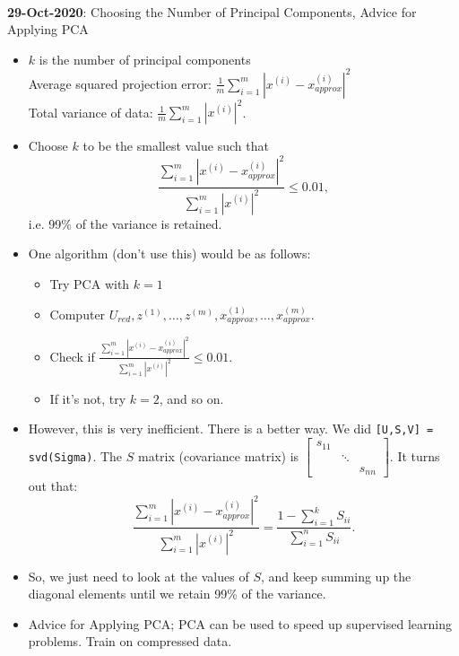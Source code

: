 \documentclass[10pt]{article}
\begin{document}
\hfill \\
{\large \textbf{29-Oct-2020}: Choosing the Number of Principal Components, Advice for Applying PCA}
\begin{itemize}
  \item $k$ is the number of principal components \\
    Average squared projection error: $\frac{1}{m}\sum_{i=1}^m \left| x^{(i)} - x_{approx}^{(i)}\right|^2$ \\
    Total variance of data: $\frac{1}{m}\sum_{i=1}^m \left| x^{(i)} \right|^2$.
  \item Choose $k$ to be the smallest value such that
    \begin{equation*}
      \frac{\sum_{i=1}^m \left| x^{(i)} - x_{approx}^{(i)} \right|^2}{\sum_{i=1}^m \left| x^{(i)} \right|^2} \leq 0.01,
    \end{equation*}
    i.e. 99\% of the variance is retained.
  \item One algorithm (don't use this) would be as follows:
    \begin{itemize}
      \item Try PCA with $k=1$
      \item Computer $U_{red}, z^{(1)}, \dots, z^{(m)}, x_{approx}^{(1)},\dots,x_{approx}^{(m)}$.
      \item Check if $\frac{\sum_{i=1}^m \left| x^{(i)} - x_{approx}^{(i)} \right|^2}{\sum_{i=1}^m \left| x^{(i)} \right|^2} \leq 0.01$.
      \item If it's not, try $k=2$, and so on.
    \end{itemize}
  \item However, this is very inefficient. There is a better way. We did \texttt{[U,S,V] = svd(Sigma)}. The $S$ matrix (covariance matrix) is $\begin{bmatrix}s_{11} & & \\ & \ddots & \\ & & s_{nn}\end{bmatrix}$. It turns out that:
    \begin{equation*}
      \frac{\sum_{i=1}^m \left| x^{(i)} - x_{approx}^{(i)} \right|^2}{\sum_{i=1}^m \left| x^{(i)} \right|^2} = \frac{1 - \sum_{i=1}^k S_{ii}}{\sum_{i=1}^n S_{ii}}.
    \end{equation*}
    \item So, we just need to look at the values of $S$, and keep summing up the diagonal elements until we retain 99\% of the variance.
    \item Advice for Applying PCA; PCA can be used to speed up supervised learning problems. Train on compressed data.

\end{itemize}
\end{document}
